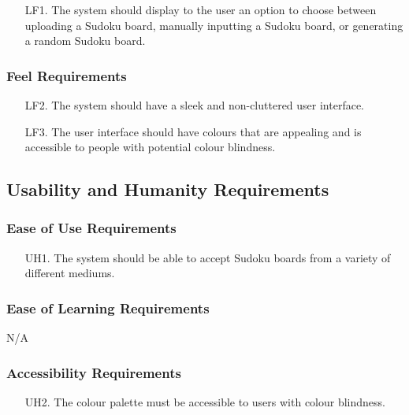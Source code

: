 \documentclass[11pt]{article}
\begin{document}
\begin{enumerate} %
    \item [LF1.] The system should display to the user an option to choose between uploading a Sudoku board, manually inputting a Sudoku board, or generating a random Sudoku board.
\end{enumerate}

\subsubsection{Feel Requirements}

\begin{enumerate} %
    \item [LF2.] The system should have a sleek and non-cluttered user interface.
    \item [LF3.] The user interface should have colours that are appealing and is accessible to people with potential colour blindness.
\end{enumerate}

\subsection{Usability and Humanity Requirements}

\subsubsection{Ease of Use Requirements}

\begin{enumerate}
    \item [UH1.] The system should be able to accept Sudoku boards from a variety of different mediums.
\end{enumerate}

\subsubsection{Ease of Learning Requirements}

N/A

\subsubsection{Accessibility Requirements}

\begin{enumerate}
    \item [UH2.] The colour palette must be accessible to users with colour blindness.
\end{enumerate}
\end{document}
